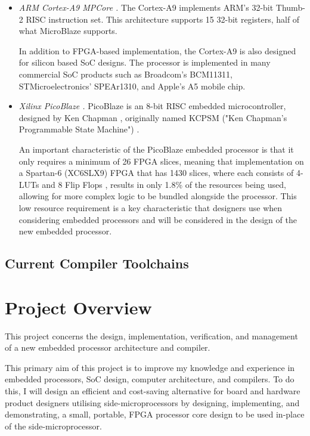 \documentclass[11pt,a4paper]{report}
\begin{document}
\begin{itemize}
\item{\textit{ARM Cortex-A9 MPCore \cite{cortexa9}.} The Cortex-A9 implements ARM's 32-bit Thumb-2 RISC instruction set. This architecture supports 15 32-bit registers, half of what MicroBlaze supports.

In addition to FPGA-based implementation, the Cortex-A9 is also designed for silicon based SoC designs. The processor is implemented in many commercial SoC products such as Broadcom's BCM11311, STMicroelectronics' SPEAr1310, and Apple's A5 mobile chip. }

\item{\textit{Xilinx PicoBlaze \cite{picoblaze}.} PicoBlaze is an  8-bit RISC embedded microcontroller, designed by Ken Chapman \cite{merchant2009platform}, originally named KCPSM ("Ken Chapman's Programmable State Machine") \cite{kamat2009unleash}.

An important characteristic of the PicoBlaze embedded processor is that it only requires a minimum of 26 FPGA slices, meaning that implementation on a Spartan-6 (XC6SLX9) FPGA that has 1430 slices, where each consists of 4-LUTs and 8 Flip Flops  \cite{spartan6}, results in only 1.8\% of the resources being used, allowing for more complex logic to be bundled alongside the processor. This low resource requirement is a key characteristic that designers use when considering embedded processors and will be considered in the design of the new embedded processor.
}


\end{itemize}

\subsection{Current Compiler Toolchains}


\newpage

\section{Project Overview}
This project concerns the design, implementation, verification, and management of a new embedded processor architecture and compiler.

This primary aim of this project is to improve my knowledge and experience in embedded processors, SoC design, computer architecture, and compilers. To do this, I will design an efficient and cost-saving alternative for board and hardware product designers utilising side-microprocessors by designing, implementing, and demonstrating, a small, portable, FPGA processor core design to be used in-place of the side-microprocessor. 
\end{document}
